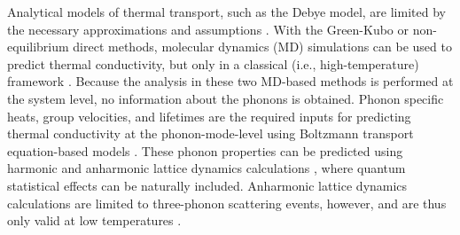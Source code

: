Analytical models of thermal transport, such as the Debye model, are 
limited by
the necessary approximations and assumptions
\cite{callaway_model_1959,holland_analysis_1963,
mcgaughey_size-dependent_2011}. 
With the Green-Kubo or
non-equilibrium direct methods, molecular dynamics (MD) simulations can 
be used to predict thermal
conductivity, but only in a classical (i.e., high-temperature) framework 
\cite{ladd_lattice_1986,mcgaughey_quantitative_2004,landry_complex_2008,
schelling_comparison_2002,sellan_size_2010,esfarjani_heat_2011,
turney_predicting_2009}. 
Because the analysis in these two MD-based methods is performed at the 
system level, 
no information about the phonons is obtained. Phonon specific heats, 
group velocities, 
and lifetimes are the required inputs for predicting thermal 
conductivity at the 
phonon-mode-level using  Boltzmann transport equation-based models 
\cite{ladd_lattice_1986,mcgaughey_quantitative_2004,
mcgaughey_size-dependent_2011,
sellan_size_2010,esfarjani_heat_2011,turney_predicting_2009,
he_thermal_2011}.
These phonon properties can be predicted using harmonic and anharmonic 
lattice dynamics
calculations 
\cite{maradudin_scattering_1962,wallace_thermodynamics_1972,
ladd_lattice_1986,dove_introduction_1993,
turney_predicting_2009,turney_assessing_2009},
 where quantum statistical effects can be naturally included. Anharmonic 
 lattice dynamics 
calculations are limited to three-phonon scattering events, however, and 
are thus only valid at 
low temperatures 
\cite{turney_predicting_2009,esfarjani_heat_2011,
wallace_thermodynamics_1972,srivastava_physics_1990}.

